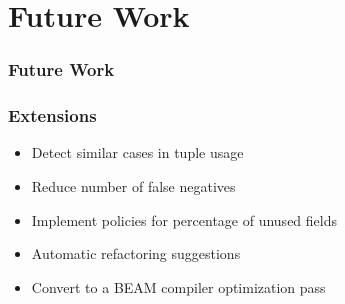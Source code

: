 \section{Future Work}
\frametitle{Future Work}

\begin{frame}
\frametitle{Extensions}

\begin{itemize}
\item Detect similar cases in tuple usage
\item Reduce number of false negatives
\item Implement policies for percentage of unused fields
\item Automatic refactoring suggestions
\item Convert to a BEAM compiler optimization pass
\end{itemize}
\end{frame}
